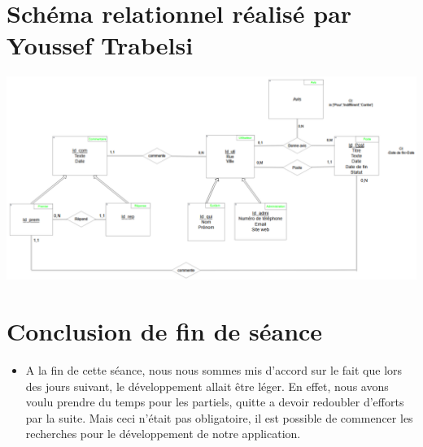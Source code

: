 \documentclass{article}
\begin{document}
\section {\huge Schéma relationnel réalisé par Youssef Trabelsi}

\includegraphics[scale=0.30]{Schema_relationnel.png}

\section {\huge Conclusion de fin de séance}

    \begin{itemize}
            \item \Large A la fin de cette séance, nous nous sommes mis d'accord sur le fait que lors des jours suivant, le développement allait être léger. En effet, nous avons voulu prendre du temps pour les partiels, quitte a devoir redoubler d'efforts par la suite. 
            Mais ceci n'était pas obligatoire, il est possible de commencer les recherches pour le développement de notre application.
    \end{itemize} 
\end{document}
